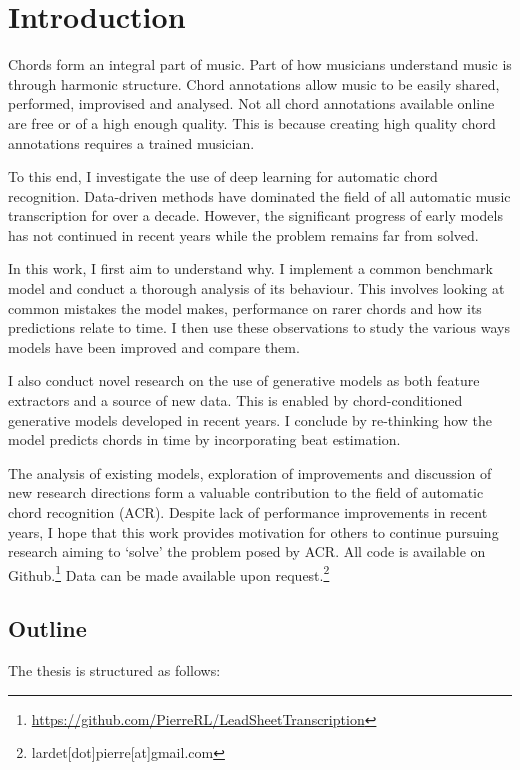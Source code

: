 \chapter{Introduction}

Chords form an integral part of music. Part of how musicians understand music is through harmonic structure. Chord annotations allow music to be easily shared, performed, improvised and analysed. Not all chord annotations available online are free or of a high enough quality. This is because creating high quality chord annotations requires a trained musician. 

To this end, I investigate the use of deep learning for automatic chord recognition. Data-driven methods have dominated the field of all automatic music transcription for over a decade. However, the significant progress of early models has not continued in recent years while the problem remains far from solved.

In this work, I first aim to understand why. I implement a common benchmark model and conduct a thorough analysis of its behaviour. This involves looking at common mistakes the model makes, performance on rarer chords and how its predictions relate to time. I then use these observations to study the various ways models have been improved and compare them. 

I also conduct novel research on the use of generative models as both feature extractors and a source of new data. This is enabled by chord-conditioned generative models developed in recent years. I conclude by re-thinking how the model predicts chords in time by incorporating beat estimation. 

The analysis of existing models, exploration of improvements and discussion of new research directions form a valuable contribution to the field of automatic chord recognition (ACR). Despite lack of performance improvements in recent years, I hope that this work provides motivation for others to continue pursuing research aiming to `solve' the problem posed by ACR. All code is available on Github.\footnote{\url{https://github.com/PierreRL/LeadSheetTranscription}} Data can be made available upon request.\footnote{lardet[dot]pierre[at]gmail.com}

\section{Outline}

The thesis is structured as follows:

